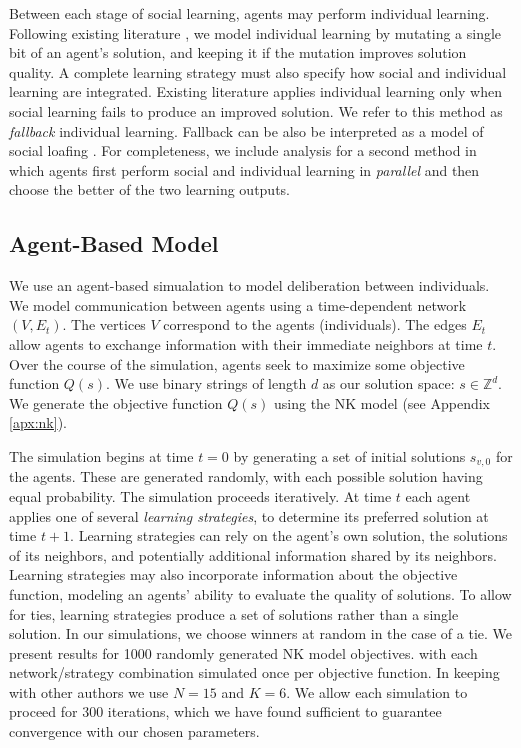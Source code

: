 Between each stage of social learning, agents may perform individual learning. Following existing literature \cite{lazer_network_2007, barkoczi_social_2016}, we model individual learning by mutating a single bit of an agent's solution, and keeping it if the mutation improves solution quality.
A complete learning strategy must also specify how social and individual learning are integrated. Existing literature \cite{lazer_network_2007, barkoczi_social_2016} applies individual learning only when social learning fails to produce an improved solution. We refer to this method as {\em fallback} individual learning. Fallback can be also be interpreted as a model of social loafing \cite{karau_social_1993}. For completeness, we include analysis for a second method in which agents first perform social and individual learning in {\em parallel} and then choose the better of the two learning outputs.

\subsection{Agent-Based Model}

We use an agent-based simualation to model deliberation between individuals.
We model communication between agents using a time-dependent network $(V,E_t)$.
The vertices $V$ correspond to the agents (individuals).
The edges $E_t$ allow agents to exchange information with their immediate neighbors at time $t$.
Over the course of the simulation, agents seek to maximize some objective function $Q(s)$.
We use binary strings of length $d$ as our solution space: $s \in \mathbb{Z}^d$.
We generate the objective function $Q(s)$ using the NK model \cite{kauffman_towards_1987, weinberger_local_1991} (see Appendix \ref{apx:nk}).

The simulation begins at time $t=0$ by generating a set of initial solutions $s_{v,0}$ for the agents.
These are generated randomly, with each possible solution having equal probability.
The simulation proceeds iteratively.
At time $t$ each agent applies one of several {\em learning strategies}, to determine its preferred solution at time $t+1$.
Learning strategies can rely on the agent's own solution, the solutions of its neighbors, and potentially additional information shared by its neighbors.
Learning strategies may also incorporate information about the objective function, modeling an agents' ability to evaluate the quality of solutions.
To allow for ties, learning strategies produce a set of solutions rather than a single solution.
In our simulations, we choose winners at random in the case of a tie.
We present results for 1000 randomly generated NK model objectives.
with each network/strategy combination simulated once per objective function.
In keeping with other authors \cite{barkoczi_social_2016, lazer_network_2007} we use $N=15$ and $K=6$.
We allow each simulation to proceed for 300 iterations, which we have found sufficient to guarantee convergence with our chosen parameters.


